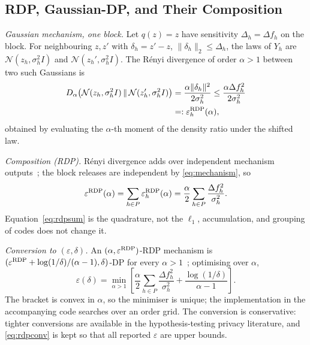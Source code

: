 \subsection{RDP, Gaussian-DP, and Their Composition}
\label{sec:rdpgdp}

\emph{Gaussian mechanism, one block.} Let $q(z)=z$ have sensitivity
$\Delta_h=\Delta f_h$ on the block. For neighbouring $z,z'$ with
$\delta_h=z'-z$, $\|\delta_h\|_2\le\Delta_h$, the laws of $Y_h$ are
$\mathcal{N}(z_h,\sigma_h^2I)$ and $\mathcal{N}(z_h',\sigma_h^2I)$. The
Rényi divergence of order $\alpha>1$ between two such Gaussians is
\begin{equation}
\begin{aligned}
D_\alpha\!\left(\mathcal{N}(z_h,\sigma_h^2I)\,\|\,
\mathcal{N}(z_h',\sigma_h^2 I)\right)
&=\frac{\alpha\|\delta_h\|^2}{2\sigma_h^2}
\le\frac{\alpha\Delta f_h^{2}}{2\sigma_h^{2}}\\
&=:\varepsilon_h^{\mathrm{RDP}}(\alpha),
\end{aligned}
\label{eq:rdpblock}
\end{equation}
obtained by evaluating the $\alpha$-th moment of the density ratio under the
shifted law.

\emph{Composition (RDP).} Rényi divergence adds over independent mechanism
outputs~\cite{mironov2017rdp}; the block releases are independent by
\eqref{eq:mechanism}, so
\begin{equation}
\varepsilon^{\mathrm{RDP}}(\alpha)=\sum_{h\in P}\varepsilon_h^{\mathrm{RDP}}(\alpha)
=\frac{\alpha}{2}\sum_{h\in P}\frac{\Delta f_h^{2}}{\sigma_h^{2}}.
\label{eq:rdpsum}
\end{equation}
Equation~\eqref{eq:rdpsum} is the quadrature, not the $\ell_1$, accumulation,
and grouping of codes does not change it.

\emph{Conversion to $(\varepsilon,\delta)$.} An
$(\alpha,\varepsilon^{\mathrm{RDP}})$-RDP mechanism is
$(\varepsilon^{\mathrm{RDP}}+\log(1/\delta)/(\alpha-1),\delta)$-DP for every
$\alpha>1$~\cite{mironov2017rdp}; optimising over $\alpha$,
\begin{equation}
\varepsilon(\delta)=\min_{\alpha>1}\left[
\frac{\alpha}{2}\sum_{h\in P}\frac{\Delta f_h^{2}}{\sigma_h^{2}}
+\frac{\log(1/\delta)}{\alpha-1}\right].
\label{eq:rdpconv}
\end{equation}
The bracket is convex in $\alpha$, so the minimiser is unique; the
implementation in the accompanying code searches over an order grid. The
conversion is conservative: tighter conversions are available in the
hypothesis-testing privacy literature, and \eqref{eq:rdpconv} is kept so that
all reported $\varepsilon$ are upper bounds.

